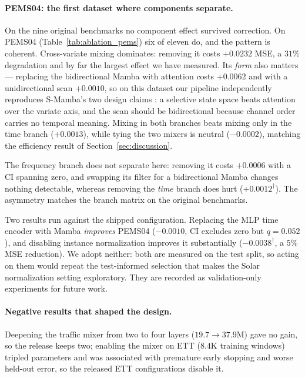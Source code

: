 \documentclass[review,12pt]{elsarticle}
\begin{document}
\paragraph{PEMS04: the first dataset where components separate.} On the nine
original benchmarks no component effect survived correction. On PEMS04
(Table~\ref{tab:ablation_pems}) six of eleven do, and the pattern is coherent.
Cross-variate mixing dominates: removing it costs $+0.0232$ MSE, a $31\%$
degradation and by far the largest effect we have measured. Its \emph{form}
also matters --- replacing the bidirectional Mamba with attention costs
$+0.0062$ and with a unidirectional scan $+0.0010$, so on this dataset our
pipeline independently reproduces S-Mamba's two design claims
\cite{smamba}: a selective state space beats attention over the variate axis,
and the scan should be bidirectional because channel order carries no
temporal meaning. Mixing in both branches beats mixing only in the time branch
($+0.0013$), while tying the two mixers is neutral ($-0.0002$), matching the
efficiency result of Section~\ref{sec:discussion}.

The frequency branch does not separate here: removing it costs $+0.0006$ with
a CI spanning zero, and swapping its filter for a bidirectional Mamba changes
nothing detectable, whereas removing the \emph{time} branch does hurt
($+0.0012^{\dagger}$). The asymmetry matches the branch matrix on the
original benchmarks.

Two results run against the shipped configuration. Replacing the MLP time
encoder with Mamba \emph{improves} PEMS04 ($-0.0010$, CI excludes zero but
$q{=}0.052$), and disabling instance normalization improves it substantially
($-0.0038^{\dagger}$, a $5\%$ MSE reduction). We adopt neither: both are
measured on the test split, so acting on them would repeat the
test-informed selection that makes the Solar normalization setting
exploratory. They are recorded as validation-only experiments for future
work.

\paragraph{Negative results that shaped the design.} Deepening the traffic
mixer from two to four layers ($19.7\rightarrow37.9$M) gave no gain, so the
release keeps two; enabling the mixer on ETT ($8.4$K training windows)
tripled parameters and was associated with premature early stopping and
worse held-out error, so the released ETT configurations disable it.
\end{document}
